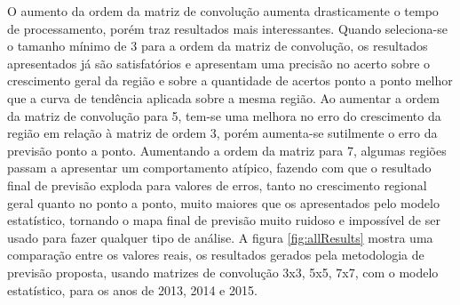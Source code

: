 O aumento da ordem da matriz de convolução aumenta drasticamente o tempo de processamento, porém traz resultados mais interessantes. Quando seleciona-se o tamanho mínimo de 3 para a ordem da matriz de convolução, os resultados apresentados já são satisfatórios e apresentam uma precisão no acerto sobre o crescimento geral da região e sobre a quantidade de acertos ponto a ponto melhor que a curva de tendência aplicada sobre a mesma região. Ao aumentar a ordem da matriz de convolução para 5, tem-se uma melhora no erro do crescimento da região em relação à matriz de ordem 3, porém aumenta-se sutilmente o erro da previsão ponto a ponto. Aumentando a ordem da matriz para 7, algumas regiões passam a apresentar um comportamento atípico, fazendo com que o resultado final de previsão exploda para valores de erros, tanto no crescimento regional geral quanto no ponto a ponto, muito maiores que os apresentados pelo modelo estatístico, tornando o mapa final de previsão muito ruidoso e impossível de ser usado para fazer qualquer tipo de análise. A figura \ref{fig:allResults} mostra uma comparação entre os valores reais, os resultados gerados pela metodologia de previsão proposta, usando matrizes de convolução 3x3, 5x5, 7x7, com o modelo estatístico, para os anos de 2013, 2014 e 2015.

